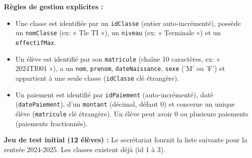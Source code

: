 \documentclass[11pt]{article}
\newcommand{\cle}[1]{{\popxbold\color{popdark}#1}}
\begin{document}
\textbf{Règles de gestion explicites :}
\begin{itemize}
    \item Une classe est identifiée par un \texttt{idClasse} (entier \cle{auto-incrémenté}), possède un \texttt{nomClasse} (ex: « Tle TI »), un \texttt{niveau} (ex: « Terminale ») et un \texttt{effectifMax}.
    \item Un élève est identifié par son \texttt{matricule} (chaîne 10 caractères, ex: « 2024TI001 »), a un \texttt{nom}, \texttt{prenom}, \texttt{dateNaissance}, \texttt{sexe} ('M' ou 'F') et appartient à une seule classe (\texttt{idClasse} clé étrangère).
    \item Un paiement est identifié par \texttt{idPaiement} (auto-incrémenté), daté (\texttt{datePaiement}), d'un \texttt{montant} (décimal, défaut 0) et concerne un unique élève (\texttt{matricule} clé étrangère). Un élève peut avoir 0 ou plusieurs paiements (paiements fractionnés).
\end{itemize}

\textbf{Jeu de test initial (12 élèves) :}
Le secrétariat fournit la liste suivante pour la rentrée 2024-2025. Les classes existent déjà (id 1 à 3).
\end{document}
